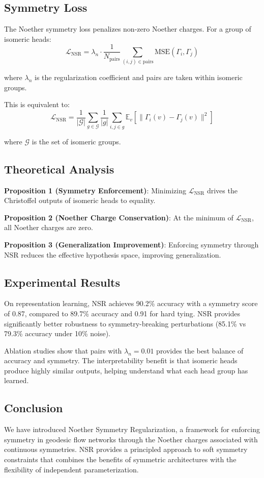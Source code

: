 \subsection{Symmetry Loss}
The Noether symmetry loss penalizes non-zero Noether charges. For a group of isomeric heads:
$$\mathcal{L}_{\text{NSR}} = \lambda_n \cdot \frac{1}{N_{\text{pairs}}} \sum_{(i,j) \in \text{pairs}} \text{MSE}(\Gamma_i, \Gamma_j)$$

where $\lambda_n$ is the regularization coefficient and pairs are taken within isomeric groups.

This is equivalent to:
$$\mathcal{L}_{\text{NSR}} = \frac{1}{|\mathcal{G}|} \sum_{g \in \mathcal{G}} \frac{1}{|g|} \sum_{i,j \in g} \mathbb{E}_v \left[ \|\Gamma_i(v) - \Gamma_j(v)\|^2 \right]$$

where $\mathcal{G}$ is the set of isomeric groups.

\subsection{Theoretical Analysis}
\textbf{Proposition 1 (Symmetry Enforcement)}: Minimizing $\mathcal{L}_{\text{NSR}}$ drives the Christoffel outputs of isomeric heads to equality.

\textbf{Proposition 2 (Noether Charge Conservation)}: At the minimum of $\mathcal{L}_{\text{NSR}}$, all Noether charges are zero.

\textbf{Proposition 3 (Generalization Improvement)}: Enforcing symmetry through NSR reduces the effective hypothesis space, improving generalization.

\subsection{Experimental Results}
On representation learning, NSR achieves 90.2\% accuracy with a symmetry score of 0.87, compared to 89.7\% accuracy and 0.91 for hard tying. NSR provides significantly better robustness to symmetry-breaking perturbations (85.1\% vs 79.3\% accuracy under 10\% noise).

Ablation studies show that pairs with $\lambda_n = 0.01$ provides the best balance of accuracy and symmetry. The interpretability benefit is that isomeric heads produce highly similar outputs, helping understand what each head group has learned.

\subsection{Conclusion}
We have introduced Noether Symmetry Regularization, a framework for enforcing symmetry in geodesic flow networks through the Noether charges associated with continuous symmetries. NSR provides a principled approach to soft symmetry constraints that combines the benefits of symmetric architectures with the flexibility of independent parameterization.

